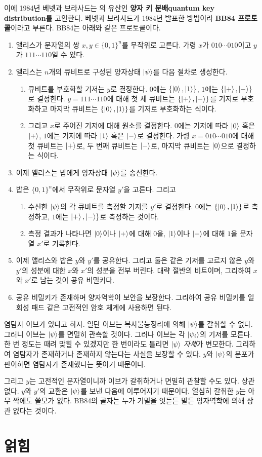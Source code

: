 \documentclass[a4paper,chapter,atbegshi]{oblivoir}
\begin{document}
이에 1984년 베넷과 브라사드는 의 유산인 \textbf{양자 키
분배\tiny quantum key distribution}를 고안한다. 베넷과 브라사드가 1984년
발표한 방법이라 \textbf{BB84 프로토콜}이라고 부른다. BB84는 아래와 같은 
프로토콜이다.
\begin{mdframed}
\begin{enumerate}[label=(\Alph*)]
  \item 앨리스가 문자열의 쌍 $x,y\in\{0,1\}^n$를 무작위로 고른다. 가령 $x$가
    $010\cdots010$이고 $y$가 $111\cdots110$일 수 있다.
  \item 앨리스는 $n$개의 큐비트로 구성된 양자상태 $\ket{\psi}$를 다음 절차로
    생성한다. 
    \begin{enumerate}[label=(\roman*)]
      \item 큐비트를 부호화할 기저는 $y$로 결정한다. 
    $0$에는 $\{\ket0,\ket1\}$, $1$에는 $\{\ket+,\ket-\}$로 결정한다.
    $y=111\cdots110$에 대해 첫 세 큐비트는 $\{\ket+,
    \ket-\}$를 기저로 부호화하고 마지막 큐비트는 $\{\ket0,\ket1\}$를 기저로 
    부호화하는 식이다. 
      \item 그리고 $x$로 주어진 기저에 대해 원소를 결정한다.
    $0$에는 기저에 따라 $\ket0$ 혹은 $\ket+$, $1$에는 기저에 따라 $\ket1$ 혹은
    $\ket-$로 결정한다. 가령 $x=010\cdots010$에 대해 첫 큐비트는 $\ket+$로,
    두 번째 큐비트는 $\ket-$로, 마지막 큐비트는 $\ket0$으로 결정하는 식이다.
  \end{enumerate}
  \item 이제 앨리스는 밥에게 양자상태 $\ket{\psi}$를 송신한다. 
  \item 밥은 $\{0,1\}^n$에서 무작위로 문자열 $y'$을 고른다. 그리고 
    \begin{enumerate}[label=(\roman*)] 
      \item 수신한 $\ket{\psi}$의 각 큐비트를 측정할 기저를
  $y'$로 결정한다. $0$에는 $\{\ket0,\ket1\}$로 측정하고, $1$에는 $\ket+,\ket-\}$로
  측정하는 것이다. 
    \item 측정 결과가 나타나면 $\ket0$이나 $\ket+$에
    대해 $0$을, $\ket1$이나 $\ket-$에 대해 $1$을 문자열 $x'$로 기록한다.
  \end{enumerate}
  \item 이제 앨리스와 밥은 $y$와 $y'$를 공유한다. 그리고 둘은 같은 기저를
    고르지 않은 $y$와 $y'$의 성분에 대한 $x$와 $x'$의 성분을 전부 버린다.
    대략 절반의 비트이며, 그리하여  $x$와 $x'$로 남는 것이 공유 비밀키다.
  \item 공유 비밀키가 존재하며 양자역학이 보안을 보장한다. 그리하여 
    공유 비밀키를 일회성 패드 같은 고전적인 암호 체계에 사용하면 된다.
\end{enumerate}
\end{mdframed}
염탐자 이브가 있다고 하자. 일단 이브는 복사불능정리에 의해 $\ket{\psi}$를
갈취할 수 없다. 그러니 이브는 $\ket{\psi}$를 면밀히 관측할
것이다. 그러나 이브는 각 $\ket{\psi_i}$의 기저를 모른다. 한 번
정도는 때려 맞힐 수 있겠지만 한 번이라도 틀리면 $\ket{\psi}$ \emph{자체}가
변모한다. 그리하여 염탐자가 존재하거나 존재하지 않는다는 사실을 보장할
수 있다. $y$와 $\ket{\psi}$의 분포가 판이하면 염탐자가 존재했다는 뜻이기 때문이다.

그리고 $y$는 고전적인 문자열이니까 이브가 갈취하거나 면밀히 관찰할 수도 있다.
상관 없다. $y$와 $y'$의 교환은 $\ket{\psi}$를 보낸 다음에 이루어지기
때문이다. 열심히 갈취한 $y$는 아무 짝에도 쓸모가 없다. BB84의 골자는
누가 기밀을 엿듣든 말든 양자역학에 의해 상관 없다는 것이다.
\chapter{얽힘}
\end{document}
